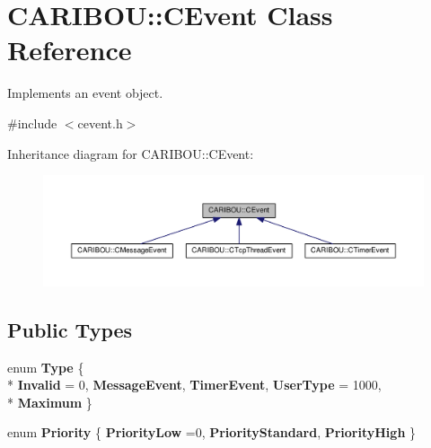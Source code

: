 \section{C\-A\-R\-I\-B\-O\-U\-:\-:C\-Event Class Reference}
\label{class_c_a_r_i_b_o_u_1_1_c_event}


Implements an event object.  




{\ttfamily \#include $<$cevent.\-h$>$}



Inheritance diagram for C\-A\-R\-I\-B\-O\-U\-:\-:C\-Event\-:\nopagebreak
\begin{figure}[H]
\begin{center}
\leavevmode
\includegraphics[width=350pt]{class_c_a_r_i_b_o_u_1_1_c_event__inherit__graph}
\end{center}
\end{figure}
\subsection*{Public Types}
\begin{DoxyCompactItemize}
\item 
enum {\bf Type} \{ \\*
{\bf Invalid} = 0, 
{\bf Message\-Event}, 
{\bf Timer\-Event}, 
{\bf User\-Type} = 1000, 
\\*
{\bf Maximum}
 \}
\item 
enum {\bf Priority} \{ {\bf Priority\-Low} =0, 
{\bf Priority\-Standard}, 
{\bf Priority\-High}
 \}
\end{DoxyCompactItemize}
